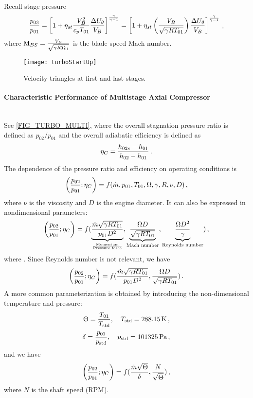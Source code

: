 Recall stage pressure
\[
  {\frac{p_{03}}{p_{01}}} = \left[1 + \eta_{st}  {\frac{V_B^2 }{c_p T_{01}}}{\frac{\Delta U_\theta}{V_B}} \right]^{{\frac{\gamma}{\gamma-1}}} = \left[1 + \eta_{st}  \left({\frac{V_B }{\sqrt{\gamma R T_{01}}}}\right) {\frac{\Delta U_\theta}{V_B}} \right]^{{\frac{\gamma}{\gamma-1}}} \,,
\]
where $\text{M}_{BS} = {\frac{V_B}{\sqrt{\gamma R T_{01}}}}$ is the blade-speed Mach number.

\begin{figure}[!htb!]
 \centering
    {\texttt{[image: turboStartUp]}}
    \caption{\label{FIG_TURBO_STARTUP}Velocity triangles at first and last stages.}
\end{figure}

\paragraph{Characteristic Performance of Multistage Axial Compressor} \mbox{} \\[0.5em]

See \cref{FIG_TURBO_MULTI}, where the overall stagnation pressure ratio is defined as $p_{02}/p_{01}$ and the overall adiabatic efficiency is defined as 
\begin{equation}
  \eta_C = {\frac{h_{02s}-h_{01}}{h_{02}-h_{01}}}\,.
\end{equation}
The dependence of the pressure ratio and efficiency on operating conditions is
\[
  \left({\frac{p_{02}}{p_{01}}}; \eta_C\right) = f(\dot{m}, p_{01}, T_{01}, \Omega, \gamma, R, \nu, D) \,,
\]
where $\nu$ is the viscosity and $D$ is the engine diameter. It can also be expressed in nondimensional parameters:
\[
  \left({\frac{p_{02}}{p_{01}}}; \eta_C\right) = f(\underbrace{{\frac{\dot{m}\sqrt{\gamma R T_{01}}}{p_{01}D^2}}}_{\frac{\text{Momentum}}{\text{Pressure force}}}, \underbrace{{\frac{\Omega D}{\sqrt{\gamma R T_{01}}}}}_\text{Mach number}, \underbrace{{\frac{\Omega D^2}{\gamma}}}_\text{Reynolds number}) \,,
\]
where . Since Reynolds number is not relevant, we have
\begin{equation}
  \left({\frac{p_{02}}{p_{01}}}; \eta_C\right) = f({\frac{\dot{m}\sqrt{\gamma R T_{01}}}{p_{01}D^2}}, {\frac{\Omega D}{\sqrt{\gamma R T_{01}}}}) \,.
\end{equation}
A more common parameterization is obtained by introducing the non-dimensional temperature and pressure:
\begin{equation}
\Theta = {\frac{T_{01}}{T_\text{std}}},\quad T_\text{std} = 288.15 \, \text{K}\,, 
\end{equation}
\begin{equation}
\delta = {\frac{p_{01}}{p_\text{std}}},\quad p_\text{std} = 101325 \, \text{Pa}\,, 
\end{equation}
and we have
\begin{equation}
  \left({\frac{p_{02}}{p_{01}}}; \eta_C\right) = f({\frac{\dot{m}\sqrt{\Theta}}{\delta}}, {\frac{N}{\sqrt{\Theta}}}) \,,
\end{equation}
where $N$ is the shaft speed (RPM).

